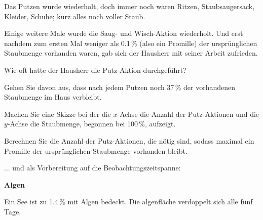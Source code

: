 Das Putzen wurde wiederholt, doch immer noch waren Ritzen,
Staubsaugersack, Kleider, Schuhe; kurz alles noch voller Staub.

Einige weitere Male wurde die Saug- und Wisch-Aktion wiederholt. Und
erst nachdem zum ersten Mal weniger als 0.1\,\% (also ein Promille) der ursprünglichen
Staubmenge vorhanden waren, gab sich der Hausherr mit seiner Arbeit
zufrieden.

Wie oft hatte der Hausherr die Putz-Aktion durchgeführt?

Gehen Sie davon aus, dass nach jedem Putzen noch 37\,\% der vorhandenen
Staubmenge im Haus verbleibt.

\begin{bbwAufgabenBlock}

\item Machen Sie eine Skizze bei der die $x$-Achse die Anzahl der
  Putz-Aktionen und die $y$-Achse die Staubmenge, begonnen bei 100\,\%,
  aufzeigt.
  
\item Berechnen Sie die Anzahl der Putz-Aktionen, die nötig sind,
    sodass maximal ein Promille der ursprünglichen Staubmenge
    vorhanden bleibt.

\end{bbwAufgabenBlock}
\platzFuerBerechnungenBisEndeSeite{}

... und als Vorbereitung auf die Beobachtungszeitspanne:

\bbwActAufgabenNr{} \textbf{Algen}

Ein See ist zu 1.4\,\% mit Algen bedeckt. Die algenfläche verdoppelt
sich alle fünf Tage.

